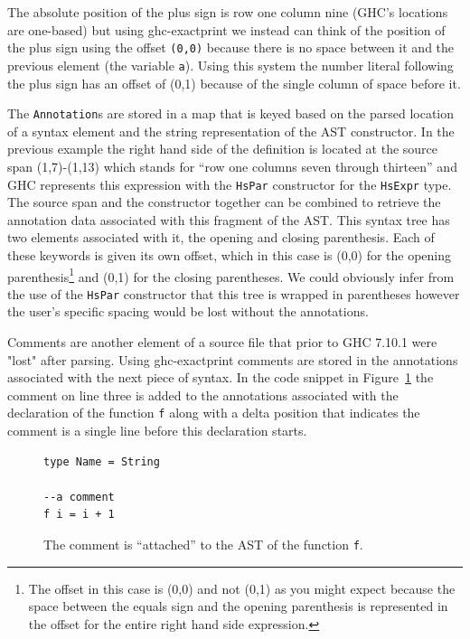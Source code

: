 The absolute position of the plus sign is row one column nine (GHC's locations are one-based) but using ghc-exactprint we instead can think of the position of the plus sign using the offset \texttt{(0,0)} because there is no space between it and the previous element (the variable \texttt{a}). Using this system the number literal following the plus sign has an offset of (0,1) because of the single column of space before it. 

The \texttt{Annotation}s are stored in a map that is keyed based on the parsed location of a syntax element and the string representation of the AST constructor. In the previous example the right hand side of the definition is located at the source span (1,7)-(1,13) which stands for ``row one columns seven through thirteen'' and GHC represents this expression with the \texttt{HsPar} constructor for the \texttt{HsExpr} type. The source span and the constructor together can be combined to retrieve the annotation data associated with this fragment of the AST. This syntax tree has two elements associated with it, the opening and closing parenthesis. Each of these keywords is given its own offset, which in this case is (0,0) for the opening parenthesis\footnote{The offset in this case is (0,0) and not (0,1) as you might expect because the space between the equals sign and the opening parenthesis is represented in the offset for the entire right hand side expression.} and (0,1) for the closing parentheses. We could obviously infer from the use of the \texttt{HsPar} constructor that this tree is wrapped in parentheses however the user's specific spacing would be lost without the annotations.

Comments are another element of a source file that prior to GHC 7.10.1 were "lost" after parsing. Using ghc-exactprint comments are stored in the annotations associated with the next piece of syntax. In the code snippet in Figure~\ref{commentSnippet} the comment on line three is added to the annotations associated with the declaration of the function \texttt{f} along with a delta position that indicates the comment is a single line before this declaration starts.

\begin{figure}[t]
\begin{lstlisting}
type Name = String

--a comment
f i = i + 1
\end{lstlisting}
\caption{The comment is ``attached'' to the AST of the function \texttt{f}.}
\label{commentSnippet}
\end{figure}





